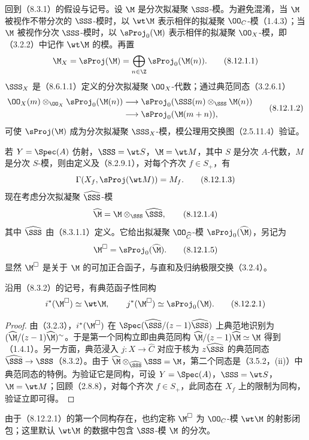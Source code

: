  回到（8.3.1）的假设与记号。设 $\M$ 是分次拟凝聚 $\SSS$-模。为避免混淆，当 $\M$ 被视作不带分次的 $\SSS$-模时，以 $\wt\M$ 表示相伴的拟凝聚 $\OO_C$-模（1.4.3）；当 $\M$ 被视作分次 $\SSS$-模时，以 $\sProj_0(\M)$ 表示相伴的拟凝聚 $\OO_X$-模，即（3.2.2）中记作 $\wt\M$ 的模。再置
\begin{equation}\M_X=\sProj(\M)=\bigoplus_{n\in\Z}\sProj_0(\M(n)).\tag{8.12.1.1}\end{equation}
$\SSS_X$ 是（8.6.1.1）定义的分次拟凝聚 $\OO_X$-代数；通过典范同态（3.2.6.1）
\begin{equation}\begin{aligned}
\OO_X(m)\otimes_{\OO_X}\sProj_0(\M(n))
&\longrightarrow\sProj_0(\SSS(m)\otimes_{\SSS}\M(n))\\
&\longrightarrow\sProj_0(\M(m+n)),
\end{aligned}\tag{8.12.1.2}\end{equation}
可使 $\sProj(\M)$ 成为分次拟凝聚 $\SSS_X$-模，模公理用交换图（2.5.11.4）验证。

若 $Y=\Spec(A)$ 仿射，$\SSS=\wt S$，$\M=\wt M$，其中 $S$ 是分次 $A$-代数，$M$ 是分次 $S$-模，则由定义及（8.2.9.1），对每个齐次 $f\in S_+$，有
\begin{equation}\Gamma(X_f,\sProj(\wt M))=M_f.\tag{8.12.1.3}\end{equation}
现在考虑分次拟凝聚 $\widehat\SSS$-模
\begin{equation}\widehat\M=\M\otimes_{\SSS}\widehat\SSS,\tag{8.12.1.4}\end{equation}
其中 $\widehat\SSS$ 由（8.3.1.1）定义。它给出拟凝聚 $\OO_{\widehat C}$-模 $\sProj_0(\widehat\M)$，另记为
\begin{equation}\M^\square=\sProj_0(\widehat\M).\tag{8.12.1.5}\end{equation}
显然 $\M^\square$ 是关于 $\M$ 的可加正合函子，与直和及归纳极限交换（3.2.4）。

 沿用（8.3.2）的记号，有典范函子性同构
\begin{equation}i^*(\M^\square)\simeq\wt\M,\qquad j^*(\M^\square)\simeq\sProj_0(\M).\tag{8.12.2.1}\end{equation}
\begin{proof}
由（3.2.3），$i^*(\M^\square)$ 在 $\Spec(\widehat\SSS/(z-1)\widehat\SSS)$ 上典范地识别为 $(\widehat\M/(z-1)\widehat\M)^{\sim}$。于是第一个同构立即由典范同构 $\widehat\M/(z-1)\widehat\M\simeq\M$ 得到（1.4.1）。另一方面，典范浸入 $j:X\to\widehat C$ 对应于核为 $z\widehat\SSS$ 的典范同态 $\widehat\SSS\to\SSS$（8.3.2）。由于 $\widehat\M\otimes_{\widehat\SSS}\SSS=\M$，第二个同态是（3.5.2，(ii)）中典范同态的特例。为验证它是同构，可设 $Y=\Spec(A)$，$\SSS=\wt S$，$\M=\wt M$；回顾（2.8.8），对每个齐次 $f\in S_+$，此同态在 $X_f$ 上的限制为同构，验证立即可得。
\end{proof}
由于（8.12.2.1）的第一个同构存在，也约定称 $\M^\square$ 为 $\OO_C$-模 $\wt\M$ 的射影闭包；这里默认 $\wt\M$ 的数据中包含 $\SSS$-模 $\M$ 的分次。

